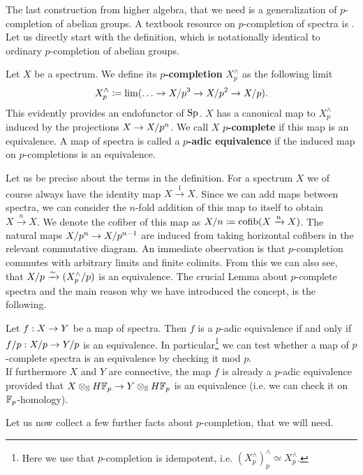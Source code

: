 The last construction from higher algebra, that we need is a generalization of $p$-completion of abelian groups. A textbook resource on $p$-completion of spectra is \cite[Section~8.4.1]{barnesroitzheimfoundation}.
Let us directly start with the definition, which is notationally identical to ordinary $p$-completion of abelian groups.
\begin{defn}
    Let $X$ be a spectrum. We define its \textbf{$p$-completion} $X^\wedge_p$ as the following limit
    \begin{equation*}
        X^\wedge_p\coloneqq \lim (\dots\ra X/p^3\ra X/p^2\ra X/p).
    \end{equation*}
    This evidently provides an endofunctor of $\operatorname{Sp}$.
    $X$ has a canonical map to $X^\wedge_p$ induced by the projections $X\rightarrow X/p^n$. We call $X$ \textbf{$p$-complete} if this map is an equivalence. A map of spectra is called a \textbf{$p$-adic equivalence} if the induced map on $p$-completions is an equivalence.  
\end{defn}
Let us be precise about the terms in the definition. For a spectrum $X$ we of course always have the identity map $X\xrightarrow{1}X$. Since we can add maps between spectra, we can consider the $n$-fold addition of this map to itself to obtain $X\xrightarrow{n}X$. We denote the cofiber of this map as $X/n\coloneqq \operatorname{cofib}(X\xrightarrow{n}X)$. The natural maps $X/p^n\rightarrow X/p^{n-1}$ are induced from taking horizontal cofibers in the relevant commutative diagram.
An immediate observation is that $p$-completion commutes with arbitrary limits and finite colimits. From this we can also see, that $X/p\xrightarrow{\sim} (X_p^{\wedge}/p)$ is an equivalence. The crucial Lemma about $p$-complete spectra and the main reason why we have introduced the concept, is the following.
\begin{lem} \label{modpreduction}
    Let $f:X\rightarrow Y$ be a map of spectra. Then $f$ is a $p$-adic equivalence if and only if $f/p:X/p\rightarrow Y/p$ is an equivalence. In particular\footnote{Here we use that $p$-completion is idempotent, i.e. $(X^\wedge_p)^\wedge_p\simeq X^\wedge_p $.} we can test whether a map of $p$-complete spectra is an equivalence by checking it mod $p$. \\
    If furthermore $X$ and $Y$ are connective, the map $f$ is already a $p$-adic equivalence provided that $X\otimes_{\mathbb{S}} H\mathbb{F}_p\to Y\otimes_{\mathbb{S}} H\mathbb{F}_p$ is an equivalence (i.e. we can check it on $\mathbb{F}_p$-homology).
\end{lem}
Let us now collect a few further facts about $p$-completion, that we will need.
